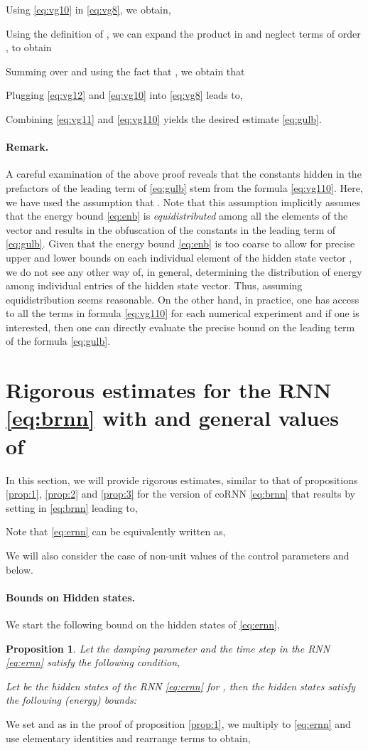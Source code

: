 \documentclass{article} \usepackage{iclr2021_conference,times}
\newtheorem{proposition}[theorem]{Proposition}
\begin{document}
Using \eqref{eq:vg10} in \eqref{eq:vg8}, we obtain,

Using the definition of , we can expand the product in  and neglect terms of order , to obtain

Summing over  and using the fact that , we obtain that

Plugging \eqref{eq:vg12} and \eqref{eq:vg10} into \eqref{eq:vg8} leads to,

Combining \eqref{eq:vg11} and \eqref{eq:vg110} yields the desired estimate \eqref{eq:gulb}.
\paragraph{Remark.} A careful examination of the above proof reveals that the constants hidden in the prefactors of the leading term  of \eqref{eq:gulb} stem from the formula \eqref{eq:vg110}. Here, we have used the assumption that . Note that this assumption implicitly assumes that the energy bound \eqref{eq:enb} is \emph{equidistributed} among all the elements of the vector  and results in the obfuscation of the constants in the leading term of \eqref{eq:gulb}. Given that the energy bound \eqref{eq:enb} is too coarse to allow for precise upper and lower bounds on each individual element of the hidden state vector , we do not see any other way of, in general, determining the distribution of energy among individual entries of the hidden state vector. Thus, assuming equidistribution seems reasonable. On the other hand, in practice, one has access to all the terms in formula \eqref{eq:vg110} for each numerical experiment and if one is interested, then one can directly evaluate the precise bound on the leading term of the formula \eqref{eq:gulb}. 
\section{Rigorous estimates for the RNN \eqref{eq:brnn} with  and general values of }
\label{sec:exp}
In this section, we will provide rigorous estimates, similar to that of propositions \ref{prop:1}, \ref{prop:2} and \ref{prop:3} for the version of coRNN \eqref{eq:brnn} that results by setting  in \eqref{eq:brnn} leading to,

Note that \eqref{eq:ernn} can be equivalently written as,

We will also consider the case of non-unit values of the control parameters  and  below.
\paragraph{Bounds on Hidden states.} We start the following bound on the hidden states of \eqref{eq:ernn},
\begin{proposition}
\label{prop:en1}
Let the damping parameter  and the time step  in the RNN \eqref{eq:ernn} satisfy the following condition,

Let  be the hidden states of the RNN \eqref{eq:ernn} for , then the hidden states satisfy the following (energy) bounds:

\end{proposition}
We set  and as in the proof of proposition \ref{prop:1}, we  multiply  to \eqref{eq:ernn} and use elementary identities and rearrange terms to obtain,
\end{document}
